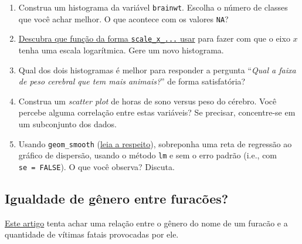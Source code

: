 \documentclass[
  11pt]{report}
\begin{document}
\begin{enumerate}
\def\labelenumi{\arabic{enumi}.}
\item
  Construa um histograma da variável \texttt{brainwt}. Escolha o número de classes que você achar melhor. O que acontece com os valores \texttt{NA}?
\item
  \href{http://sillasgonzaga.com/material/curso_visualizacao/ggplot2-parte-ii.html\#customizando-escalas}{Descubra que função da forma \texttt{scale\_x\_...} usar} para fazer com que o eixo $x$ tenha uma escala logarítmica. Gere um novo histograma.
\item
  Qual dos dois histogramas é melhor para responder a pergunta ``\emph{Qual a faixa de peso cerebral que tem mais animais?}'' de forma satisfatória?
\item
  Construa um \emph{scatter plot} de horas de sono versus peso do cérebro. Você percebe alguma correlação entre estas variáveis? Se precisar, concentre-se em um subconjunto dos dados.
\item
  Usando \texttt{geom\_smooth} (\href{https://cdr.ibpad.com.br/ggplot2.html\#objetos-geom\%C3\%A9tricos-e-tipos-de-gr\%C3\%A1ficos}{leia a respeito}), sobreponha uma reta de regressão ao gráfico de dispersão, usando o método \texttt{lm} e sem o erro padrão (i.e., com \texttt{se\ =\ FALSE}). O que você observa? Discuta.
\end{enumerate}

\hypertarget{igualdade-de-guxeanero-entre-furacuxf5es}{%
\subsection{Igualdade de gênero entre furacões?}\label{igualdade-de-guxeanero-entre-furacuxf5es}}

\href{https://www.pnas.org/content/111/24/8782}{Este artigo} tenta achar uma relação entre o gênero do nome de um furacão e a quantidade de vítimas fatais provocadas por ele.
\end{document}
